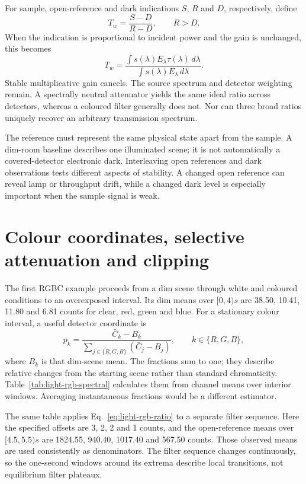 For sample, open-reference and dark indications $S$, $R$ and $D$, respectively, define
\begin{equation}
 T_w=\frac{S-D}{R-D},\qquad R>D.
 \label{eq:light-rgb-ratio}
\end{equation}
When the indication is proportional to incident power and the gain is unchanged, this becomes
\begin{equation}
 T_w=\frac{\int s(\lambda)E_\lambda\tau(\lambda)\,d\lambda}
 {\int s(\lambda)E_\lambda\,d\lambda}.
 \label{eq:light-rgb-weighting}
\end{equation}
Stable multiplicative gain cancels. The source spectrum and detector weighting remain. A spectrally neutral attenuator yields the same ideal ratio across detectors, whereas a coloured filter generally does not. Nor can three broad ratios uniquely recover an arbitrary transmission spectrum.

The reference must represent the same physical state apart from the sample. A dim-room baseline describes one illuminated scene; it is not automatically a covered-detector electronic dark. Interleaving open references and dark observations tests different aspects of stability. A changed open reference can reveal lamp or throughput drift, while a changed dark level is especially important when the sample signal is weak.

\section{Colour coordinates, selective attenuation and clipping}
The first RGBC example proceeds from a dim scene through white and coloured conditions to an overexposed interval. Its dim means over $[0,4)\unit{s}$ are 38.50, 10.41, 11.80 and 6.81 counts for clear, red, green and blue. For a stationary colour interval, a useful detector coordinate is
\begin{equation}
 p_k=\frac{\bar C_k-B_k}{\sum_{j\in\{R,G,B\}}(\bar C_j-B_j)},
 \qquad k\in\{R,G,B\},
 \label{eq:light-rgb-fractions}
\end{equation}
where $B_k$ is that dim-scene mean. The fractions sum to one; they describe relative changes from the starting scene rather than standard chromaticity. Table~\ref{tab:light-rgb-spectral} calculates them from channel means over interior windows. Averaging instantaneous fractions would be a different estimator.

The same table applies Eq.~\eqref{eq:light-rgb-ratio} to a separate filter sequence. Here the specified offsets are 3, 2, 2 and 1 counts, and the open-reference means over $[4.5,5.5)\unit{s}$ are 1824.55, 940.40, 1017.40 and 567.50 counts. Those observed means are used consistently as denominators. The filter sequence changes continuously, so the one-second windows around its extrema describe local transitions, not equilibrium filter plateaux.

